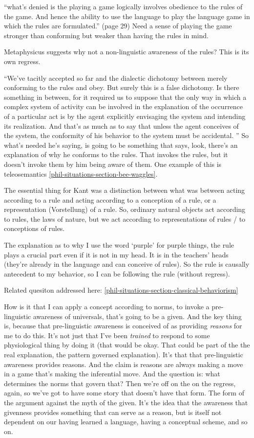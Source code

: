 \documentclass[12pt,a4paper]{report}
\begin{document}
``what's denied is the playing a game logically involves obedience to the rules of the game. And hence the ability to use the language to play the language game in which the rules are formulated.'' (page 29) Need a sense of playing the game stronger than conforming but weaker than having the rules in mind.

Metaphysicus suggests why not a non-linguistic awareness of the rules? This is its own regress.

``We've tacitly accepted so far and the dialectic dichotomy between merely conforming to the rules and obey. But surely this is a false dichotomy. Is there something in between, for it required us to suppose that the only way in which a complex system of activity can be involved in the explanation of the occurrence of a particular act is by the agent explicitly envisaging the system and intending its realization. And that's as much as to say that unless the agent conceives of the system, the conformity of his behavior to the system must be accidental. '' So what's needed he's saying, is going to be something that says, look, there's an explanation of why he conforms to the rules. That invokes the rules, but it doesn't invoke them by him being aware of them. One example of this is teleosemantics \ref{phil-situations-section-bee-waggles}.

The essential thing for Kant was a distinction between what was between acting according to a rule and acting according to a conception of a rule, or a representation (Vorstellung) of a rule. So, ordinary natural objects act according to rules, the laws of nature, but we act according to representations of rules / to conceptions of rules.

The explanation as to why I use the word `purple' for purple things, the rule plays a crucial part even if it is not in my head. It is in the teachers' heads (they're already in the language and can conceive of rules). So the rule is causally antecedent to my behavior, so I can be following the rule (without regress).

Related quesiton addressed here: \ref{phil-situations-section-classical-behaviorism}

How is it that I can apply a concept according to norms, to invoke a pre-linguistic awareness of universals, that's going to be a given. And the key thing is, because that pre-linguistic awareness is conceived of as providing \emph{reasons} for me to do this. It's not just that I've been \emph{trained} to respond to some physiological thing by doing it (that would be okay. That could be part of the the real explanation, the pattern governed explanation). It's that that pre-linguistic awareness provides reasons. And the claim is reasons are always making a move in a game that's making the inferential move. And the question is: what determines the norms that govern that? Then we're off on the on the regress, again, so we've got to have some story that doesn't have that form. The form of the argument against the myth of the given. It's the idea that the awareness that givenness provides something that can serve as a reason, but is itself not dependent on our having learned a language, having a conceptual scheme, and so on.
\end{document}
